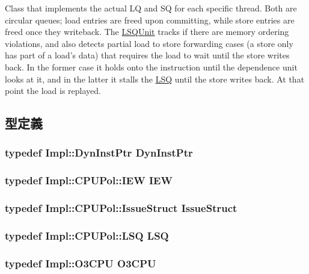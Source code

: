 Class that implements the actual LQ and SQ for each specific thread. Both are circular queues; load entries are freed upon committing, while store entries are freed once they writeback. The \hyperlink{classLSQUnit}{LSQUnit} tracks if there are memory ordering violations, and also detects partial load to store forwarding cases (a store only has part of a load's data) that requires the load to wait until the store writes back. In the former case it holds onto the instruction until the dependence unit looks at it, and in the latter it stalls the \hyperlink{classLSQ}{LSQ} until the store writes back. At that point the load is replayed. 

\subsection{型定義}
\hypertarget{classLSQUnit_a028ce10889c5f6450239d9e9a7347976}{
\subsubsection[{DynInstPtr}]{\setlength{\rightskip}{0pt plus 5cm}typedef Impl::DynInstPtr {\bf DynInstPtr}}}
\label{classLSQUnit_a028ce10889c5f6450239d9e9a7347976}
\hypertarget{classLSQUnit_a23f60a4095b5240dfcb18a4ec40210a9}{
\subsubsection[{IEW}]{\setlength{\rightskip}{0pt plus 5cm}typedef Impl::CPUPol::IEW {\bf IEW}}}
\label{classLSQUnit_a23f60a4095b5240dfcb18a4ec40210a9}
\hypertarget{classLSQUnit_aa56c7524890b3a6337668c507be0f272}{
\subsubsection[{IssueStruct}]{\setlength{\rightskip}{0pt plus 5cm}typedef Impl::CPUPol::IssueStruct {\bf IssueStruct}}}
\label{classLSQUnit_aa56c7524890b3a6337668c507be0f272}
\hypertarget{classLSQUnit_acf05a3db8421d1ca800c285cf9a86301}{
\subsubsection[{LSQ}]{\setlength{\rightskip}{0pt plus 5cm}typedef Impl::CPUPol::LSQ {\bf LSQ}}}
\label{classLSQUnit_acf05a3db8421d1ca800c285cf9a86301}
\hypertarget{classLSQUnit_a44622cf06940413482836cb62931ac3f}{
\subsubsection[{O3CPU}]{\setlength{\rightskip}{0pt plus 5cm}typedef Impl::O3CPU {\bf O3CPU}}}
\label{classLSQUnit_a44622cf06940413482836cb62931ac3f}


